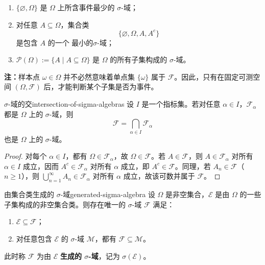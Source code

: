 \begin{example}
\begin{enumerate}
\item $\{\varnothing,\Omega\}$ 是 $\Omega$ 上所含事件最少的 $\sigma$-域；
\item 对任意 $A\subseteq\Omega$，集合类
\[
\{\varnothing,\Omega,A,A^c\}
\]
是包含 $A$ 的一个 最小的$\sigma$-域；
\item $\mathcal{P}(\Omega):=\{A\mid A\subseteq\Omega\}$ 是 $\Omega$ 的所有子集构成的 $\sigma$-域。
\end{enumerate}
\end{example}

\textbf{注：}样本点 $\omega\in\Omega$ 并不必然意味着单点集 $\{\omega\}$ 属于 $\mathscr{F}$。因此，只有在固定可测空间 $(\Omega,\mathscr{F})$ 后，才能判断某个子集是否为事件。

\begin{proposition}{$\sigma$-域的交}{intersection-of-sigma-algebras}
设 $I$ 是一个指标集。若对任意 $\alpha\in I$，$\mathscr{F}_\alpha$ 都是 $\Omega$ 上的 $\sigma$-域，则
\[
\mathscr{F}=\bigcap_{\alpha\in I}\mathscr{F}_\alpha
\]
也是 $\Omega$ 上的 $\sigma$-域。
\end{proposition}

\begin{proof}
对每个 $\alpha\in I$，都有 $\Omega\in\mathscr{F}_\alpha$，故 $\Omega\in\mathscr{F}$。若 $A\in\mathscr{F}$，则 $A\in\mathscr{F}_\alpha$ 对所有 $\alpha\in I$ 成立，因而 $A^c\in\mathscr{F}_\alpha$ 对所有 $\alpha$ 成立，即 $A^c\in\mathscr{F}$。同理，若 $A_n\in\mathscr{F}$（$n\geq1$），则 $\bigcup_{n=1}^{\infty}A_n\in\mathscr{F}_\alpha$ 对所有 $\alpha$ 成立，故该可数并属于 $\mathscr{F}$。
\end{proof}

\begin{mytheorem}{由集合类生成的 $\sigma$-域}{generated-sigma-algebra}
设 $\Omega$ 是非空集合，$\mathscr{E}$ 是由 $\Omega$ 的一些子集构成的非空集合类。则存在唯一的 $\sigma$-域 $\mathscr{F}$ 满足：
\begin{enumerate}
\item $\mathscr{E}\subseteq\mathscr{F}$；
\item 对任意包含 $\mathscr{E}$ 的 $\sigma$-域 $\mathcal{M}$，都有 $\mathscr{F}\subseteq\mathcal{M}$。
\end{enumerate}
此时称 $\mathscr{F}$ 为由 $\mathscr{E}$ \textbf{生成的 $\sigma$-域}，记为 $\sigma(\mathscr{E})$。
\end{mytheorem}


